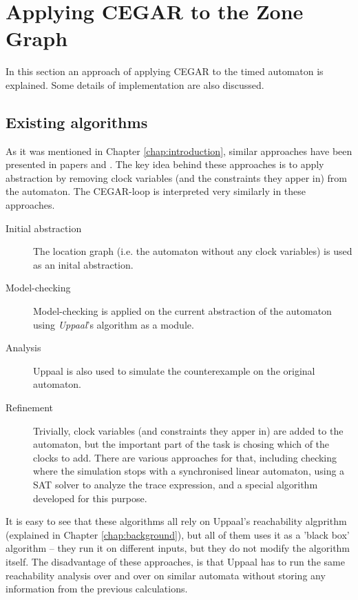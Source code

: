 \chapter{Applying CEGAR to the Zone Graph} \label{sec:timed_cegar}

In this section an approach of applying CEGAR to the timed
automaton is explained. Some details of implementation are also
discussed.

\section{Existing algorithms}
  
 As it was mentioned in Chapter \ref{chap:introduction}, similar approaches have been presented in papers \cite{dierks2007automatic, he2010compositional} and \cite{okano2011clock}. The key idea behind these approaches
 is to apply abstraction by removing clock variables (and the constraints they apper in) from the automaton. The CEGAR-loop is interpreted very similarly in these approaches.
 
 \begin{description}
 	\item[Initial abstraction] The location graph (i.e. the automaton without any clock variables) is used as an inital abstraction.
 	\item[Model-checking] Model-checking is applied on the current abstraction of the automaton using \emph{Uppaal}'s algorithm as a module.
 	\item[Analysis] Uppaal is also used to simulate the counterexample on the original automaton.
 	\item[Refinement] Trivially, clock variables (and constraints they apper in) are added to the automaton, but the important part of the task is chosing which of the clocks to add. There are various approaches for that, including checking where the simulation stops with a synchronised linear automaton, using a SAT solver to analyze the trace expression, and a special algorithm developed for this purpose.
 \end{description}
 
 It is easy to see that these algorithms all rely on Uppaal's reachability algprithm (explained in Chapter \ref{chap:background}), but all of them uses it as a 'black box' algorithm -- they run it on different inputs, but they do not modify the algorithm itself. The disadvantage of these approaches, is that Uppaal has to run the same reachability analysis over and over on similar automata without storing any information from the previous calculations.
 
